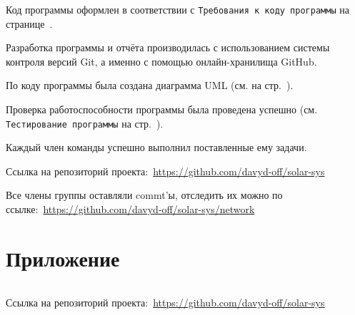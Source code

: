 \documentclass[14pt, oneside]{altsu-report}
\begin{document}
Код программы оформлен в соответствии с \texttt{Требования к коду программы} на странице~\pageref{requirement}.

Разработка программы и отчёта производилась с использованием системы контроля версий Git, а именно с помощью онлайн-хранилища GitHub.

По коду программы была создана диаграмма UML (см. на стр.~\pageref{uml}).

Проверка работоспособности программы была проведена успешно (см. \texttt{Тестирование программы} на стр.~\pageref{test}).

Каждый член команды успешно выполнил поставленные ему задачи.

Ссылка на репозиторий проекта:~\textcolor{blue}{\url{https://github.com/davyd-off/solar-sys}}

Все члены группы оставляли commt'ы, отследить их можно по ссылке:~\textcolor{blue}{\url{https://github.com/davyd-off/solar-sys/network}}

\newpage
{}
\printbibliography[title={Список использованной литературы}]

\newpage
\chapter*{Приложение}

\begin{code}
\label{code:solar-sys}
\inputminted[mathescape,linenos,frame=lines,breaklines]{Python}{src/SolarSystem.py}
\end{code}
Ссылка на репозиторий проекта:~\textcolor{blue}{\url{https://github.com/davyd-off/solar-sys}}
\end{document}

